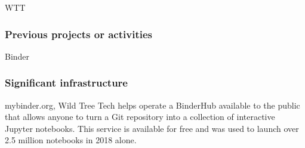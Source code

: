 \begin{sitedescription}{WTT}
\subsubsection*{Previous projects or activities}

\begin{compactenum}
\item Binder
\end{compactenum}

\subsubsection*{Significant infrastructure}
\begin{compactenum}
\item mybinder.org, Wild Tree Tech helps operate a BinderHub available to the public that allows anyone to turn a Git repository into a collection of interactive Jupyter notebooks. This service is available for free and was used to launch over 2.5 million notebooks in 2018 alone.
\end{compactenum}

\end{sitedescription}
